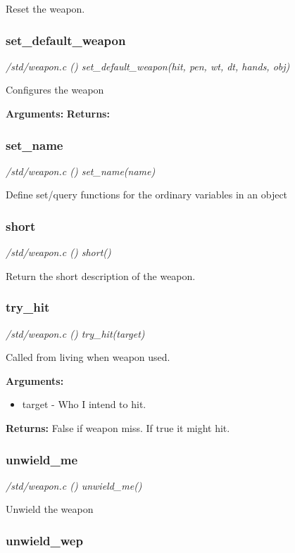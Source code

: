 Reset the weapon. 


\subsubsection{set\_default\_weapon}

{\em /std/weapon.c () set\_default\_weapon(hit, pen, wt, dt, hands, obj)}

Configures the weapon

{\bf Arguments:}
{\bf Returns:} 


\subsubsection{set\_name}

{\em /std/weapon.c () set\_name(name)}

Define set/query functions for the ordinary variables in an object


\subsubsection{short}

{\em /std/weapon.c () short()}

Return the short description of the weapon.


\subsubsection{try\_hit}

{\em /std/weapon.c () try\_hit(target)}

Called from living when weapon used.

{\bf Arguments:}
\begin{itemize}
\item      target - Who I intend to hit.
\end{itemize}

{\bf Returns:}        False if weapon miss. If true it might hit.


\subsubsection{unwield\_me}

{\em /std/weapon.c () unwield\_me()}

Unwield the weapon


\subsubsection{unwield\_wep}

